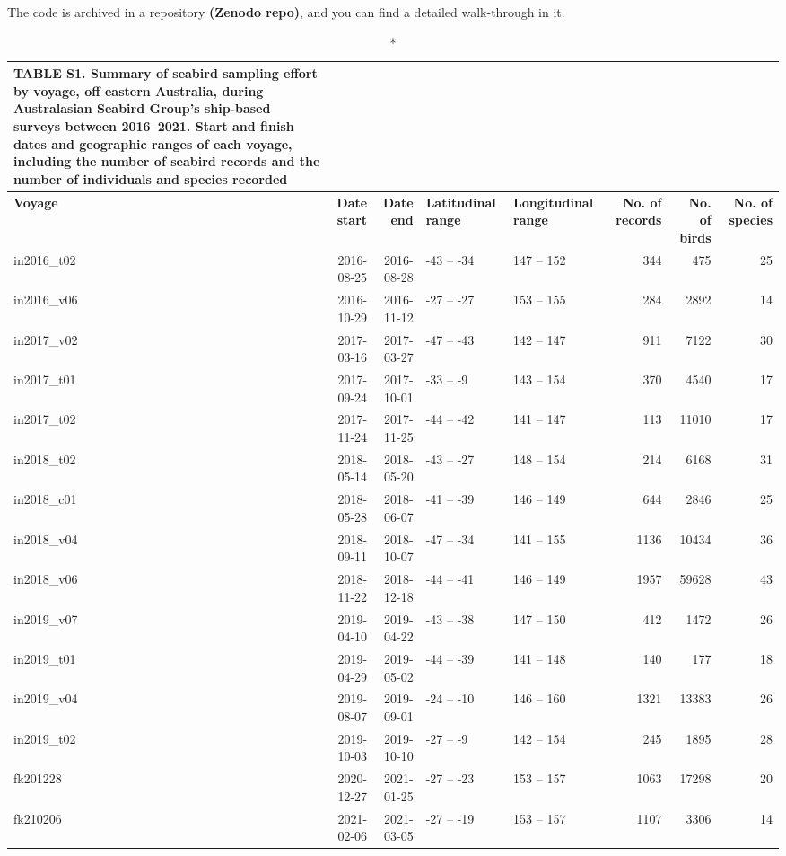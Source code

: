 \documentclass[
]{article}
\begin{document}
The code is archived in a repository \textbf{(Zenodo repo)}, and you can
find a detailed walk-through in it.

\newpage

\begin{landscape}

\begin{longtable}{lrrllrrr}
\caption*{
{\large \textbf{TABLE S1.} Summary of seabird sampling effort by voyage, off eastern Australia, during Australasian Seabird Group's ship-based surveys between 2016--2021. Start and finish dates and geographic ranges of each voyage, including the number of seabird records and the number of individuals and species recorded}
} \\ 
\toprule
\textbf{Voyage} & \textbf{Date start} & \textbf{Date end} & \textbf{Latitudinal range} & \textbf{Longitudinal range} & \textbf{No. of records} & \textbf{No. of birds} & \textbf{No. of species} \\ 
\midrule
in2016\_t02 & 2016-08-25 & 2016-08-28 & -43 – -34 & 147 – 152 & 344 & 475 & 25 \\ 
in2016\_v06 & 2016-10-29 & 2016-11-12 & -27 – -27 & 153 – 155 & 284 & 2892 & 14 \\ 
in2017\_v02 & 2017-03-16 & 2017-03-27 & -47 – -43 & 142 – 147 & 911 & 7122 & 30 \\ 
in2017\_t01 & 2017-09-24 & 2017-10-01 & -33 – -9 & 143 – 154 & 370 & 4540 & 17 \\ 
in2017\_t02 & 2017-11-24 & 2017-11-25 & -44 – -42 & 141 – 147 & 113 & 11010 & 17 \\ 
in2018\_t02 & 2018-05-14 & 2018-05-20 & -43 – -27 & 148 – 154 & 214 & 6168 & 31 \\ 
in2018\_c01 & 2018-05-28 & 2018-06-07 & -41 – -39 & 146 – 149 & 644 & 2846 & 25 \\ 
in2018\_v04 & 2018-09-11 & 2018-10-07 & -47 – -34 & 141 – 155 & 1136 & 10434 & 36 \\ 
in2018\_v06 & 2018-11-22 & 2018-12-18 & -44 – -41 & 146 – 149 & 1957 & 59628 & 43 \\ 
in2019\_v07 & 2019-04-10 & 2019-04-22 & -43 – -38 & 147 – 150 & 412 & 1472 & 26 \\ 
in2019\_t01 & 2019-04-29 & 2019-05-02 & -44 – -39 & 141 – 148 & 140 & 177 & 18 \\ 
in2019\_v04 & 2019-08-07 & 2019-09-01 & -24 – -10 & 146 – 160 & 1321 & 13383 & 26 \\ 
in2019\_t02 & 2019-10-03 & 2019-10-10 & -27 – -9 & 142 – 154 & 245 & 1895 & 28 \\ 
fk201228 & 2020-12-27 & 2021-01-25 & -27 – -23 & 153 – 157 & 1063 & 17298 & 20 \\ 
fk210206 & 2021-02-06 & 2021-03-05 & -27 – -19 & 153 – 157 & 1107 & 3306 & 14 \\ 
\bottomrule
\end{longtable}


\end{landscape}
\end{document}
